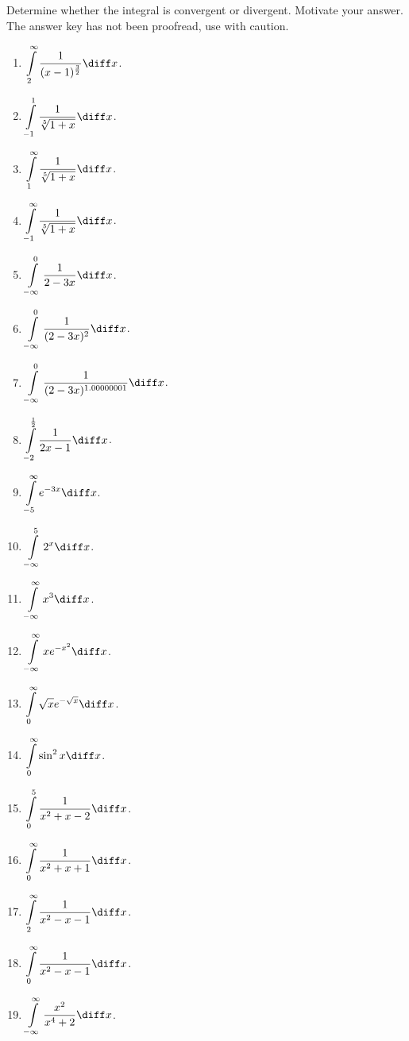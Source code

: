 Determine whether the integral is convergent or divergent. Motivate your answer. The answer key has not been proofread, use with caution.

\begin{multicols}{2}
\begin{enumerate}[ref={\fcProblemRef}]
\item $\displaystyle \int\limits_{2}^{\infty}\frac{1}{(x-1)^{\frac32}} \diff x$.
\item $\displaystyle \int\limits_{-1}^{1}\frac{1}{\sqrt[5]{1+x}} \diff x$.
\item $\displaystyle \int\limits_{1}^{\infty }\frac{1}{\sqrt[5]{1+x}} \diff x$.
\item $\displaystyle \int\limits_{-1}^{\infty }\frac{1}{\sqrt[5]{1+x}} \diff x$.
\item $\displaystyle \int\limits_{-\infty }^{0}\frac{1}{2-3x} \diff x$.
\item $\displaystyle \int\limits_{-\infty }^{0}\frac{1}{(2-3x)^{2}} \diff x$.
\item $\displaystyle \int\limits_{-\infty }^{0}\frac{1}{(2-3x)^{1.00000001}} \diff x$.
\item $\displaystyle \int\limits_{-2}^{ \frac{1}{ 2}} \frac{1}{2x-1} \diff x$.
\item $\displaystyle \int\limits_{-5}^{\infty} e^{-3x} \diff x$.
\item $\displaystyle \int\limits_{-\infty }^{5}  2^x \diff x$.
\item $\displaystyle \int\limits_{-\infty }^{\infty}x^3 \diff x$.
\item  $\displaystyle \int\limits_{-\infty}^{\infty} x e^{-x^2} \diff x$.
\item \label{problemConvergencesqrt(x)e^-sqrt(x)zerotoinfty} $\displaystyle \int\limits_{0}^{\infty} \sqrt{x} e^{-\sqrt{x}} \diff x$.
\item $\displaystyle \int\limits_{0}^{\infty}\sin^2 x \diff x$.
\item $\displaystyle \int\limits_{0}^{5}\frac{1}{x^2+x-2} \diff x$.
\item $\displaystyle \int\limits_{0}^{\infty}\frac{1}{x^2+x+1} \diff x$.
\item $\displaystyle \int\limits_{2}^{\infty}\frac{1}{x^2-x-1} \diff x$.
\item $\displaystyle \int\limits_{0}^{\infty}\frac{1}{x^2-x-1} \diff x$.
\item \label{problemConvergencex^2/(x^4+2)from-inftyto+infty}

$\displaystyle \int\limits_{-\infty}^{\infty} \frac{x^2}{x^4+2} \diff x$.
\end{enumerate}
\end{multicols}

